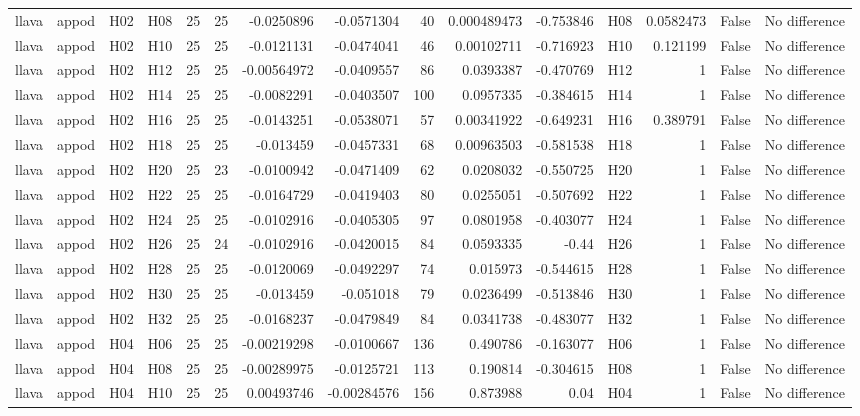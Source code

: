 \begin{longtable}{llllrrrrrrrlrrl}
llava & appod & H02 & H08 & 25 & 25 & -0.0250896 & -0.0571304 & 40 & 0.000489473 & -0.753846 & H08 & 0.0582473 & False & No difference \\
llava & appod & H02 & H10 & 25 & 25 & -0.0121131 & -0.0474041 & 46 & 0.00102711 & -0.716923 & H10 & 0.121199 & False & No difference \\
llava & appod & H02 & H12 & 25 & 25 & -0.00564972 & -0.0409557 & 86 & 0.0393387 & -0.470769 & H12 & 1 & False & No difference \\
llava & appod & H02 & H14 & 25 & 25 & -0.0082291 & -0.0403507 & 100 & 0.0957335 & -0.384615 & H14 & 1 & False & No difference \\
llava & appod & H02 & H16 & 25 & 25 & -0.0143251 & -0.0538071 & 57 & 0.00341922 & -0.649231 & H16 & 0.389791 & False & No difference \\
llava & appod & H02 & H18 & 25 & 25 & -0.013459 & -0.0457331 & 68 & 0.00963503 & -0.581538 & H18 & 1 & False & No difference \\
llava & appod & H02 & H20 & 25 & 23 & -0.0100942 & -0.0471409 & 62 & 0.0208032 & -0.550725 & H20 & 1 & False & No difference \\
llava & appod & H02 & H22 & 25 & 25 & -0.0164729 & -0.0419403 & 80 & 0.0255051 & -0.507692 & H22 & 1 & False & No difference \\
llava & appod & H02 & H24 & 25 & 25 & -0.0102916 & -0.0405305 & 97 & 0.0801958 & -0.403077 & H24 & 1 & False & No difference \\
llava & appod & H02 & H26 & 25 & 24 & -0.0102916 & -0.0420015 & 84 & 0.0593335 & -0.44 & H26 & 1 & False & No difference \\
llava & appod & H02 & H28 & 25 & 25 & -0.0120069 & -0.0492297 & 74 & 0.015973 & -0.544615 & H28 & 1 & False & No difference \\
llava & appod & H02 & H30 & 25 & 25 & -0.013459 & -0.051018 & 79 & 0.0236499 & -0.513846 & H30 & 1 & False & No difference \\
llava & appod & H02 & H32 & 25 & 25 & -0.0168237 & -0.0479849 & 84 & 0.0341738 & -0.483077 & H32 & 1 & False & No difference \\
llava & appod & H04 & H06 & 25 & 25 & -0.00219298 & -0.0100667 & 136 & 0.490786 & -0.163077 & H06 & 1 & False & No difference \\
llava & appod & H04 & H08 & 25 & 25 & -0.00289975 & -0.0125721 & 113 & 0.190814 & -0.304615 & H08 & 1 & False & No difference \\
llava & appod & H04 & H10 & 25 & 25 & 0.00493746 & -0.00284576 & 156 & 0.873988 & 0.04 & H04 & 1 & False & No difference \\

\end{longtable}
